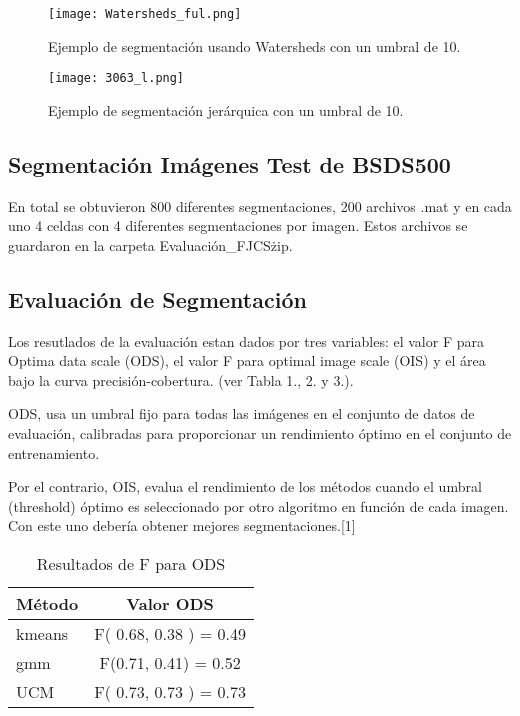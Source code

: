\documentclass[10pt,twocolumn,letterpaper]{article}
\begin{document}
\begin{figure}[t]
\begin{center}

   \texttt{[image: Watersheds\_ful.png]}
\end{center}
   \caption{Ejemplo de segmentación usando Watersheds con un umbral de 10.}
\label{fig:long}
\label{fig:onecol}
\end{figure}

\begin{figure}[t]
\begin{center}
   \texttt{[image: 3063\_l.png]}
\end{center}
   \caption{Ejemplo de segmentación jerárquica con un umbral de 10.}
\label{fig:long}
\label{fig:onecol}
\end{figure}

\subsection{Segmentación Imágenes Test de BSDS500}

En total se obtuvieron 800 diferentes segmentaciones, 200 archivos .mat y en cada uno 4 celdas con 4 diferentes segmentaciones por imagen. Estos archivos se guardaron en la carpeta Evaluación\_FJCS\.zip. 


\subsection{Evaluación de Segmentación}

Los resutlados de la evaluación estan dados por tres variables: el valor F para Optima data scale (ODS), el valor F para optimal image scale (OIS) y el área bajo la curva precisión-cobertura. (ver Tabla 1., 2. y 3.).

ODS, usa un umbral fijo para todas las imágenes en el conjunto de datos de evaluación, calibradas para proporcionar un rendimiento óptimo en el conjunto de entrenamiento.

Por el contrario, OIS, evalua el rendimiento de los métodos cuando el umbral (threshold) óptimo es seleccionado por otro algoritmo en función de cada imagen. Con este uno debería obtener mejores segmentaciones.[1]

\begin{table}
\begin{center}
\begin{tabular}{|l|c|}
\hline
Método & Valor ODS \\
\hline\hline
kmeans & F( 0.68, 0.38 ) = 0.49\\
gmm & F(0.71, 0.41) = 0.52  \\
UCM & F( 0.73, 0.73 ) = 0.73\\
\hline
\end{tabular}
\end{center}
\caption{Resultados de F para ODS}
\end{table}
\end{document}

